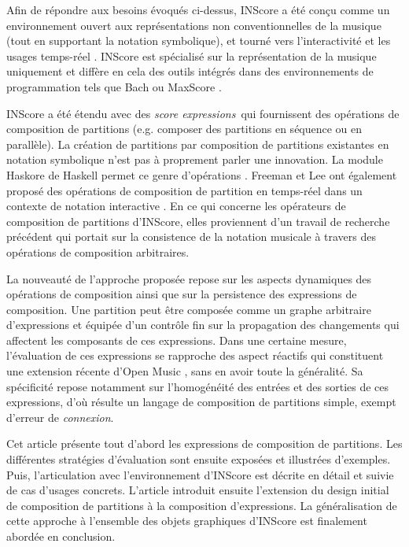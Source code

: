 \documentclass{article}
\newcommand{\sExprs}{\emph{score expressions}}
\begin{document}
Afin de répondre aux besoins évoqués ci-dessus, INScore \cite{Fober:12a,fober14c} a été conçu comme un environnement ouvert aux représentations non conventionnelles de la musique (tout en supportant la notation symbolique), et tourné vers l'interactivité et les usages temps-réel \cite{Fober:13b, Fober:14b}. INScore est spécialisé sur la représentation de la musique uniquement et diffère en cela des outils intégrés dans des environnements de programmation tels que Bach \cite{agostini12b} ou MaxScore \cite{didko08}. 

INScore a été étendu avec des \sExprs\ qui fournissent des opérations de composition de partitions (e.g. composer des partitions en séquence ou en parallèle). La création de partitions par composition de partitions existantes en notation symbolique n'est pas à proprement parler une innovation. La module Haskore de Haskell permet ce genre d'opérations  \cite{haskore}. Freeman et Lee ont également proposé des opérations de composition de partition en temps-réel dans un contexte de notation interactive \cite{Lee:2013}. En ce qui concerne les opérateurs de composition de partitions d'INScore, elles proviennent d'un travail de recherche précédent \cite{fober12b} qui portait sur la consistence de la notation musicale à travers des opérations de composition arbitraires.

La nouveauté de l'approche proposée repose sur les aspects dynamiques des opérations de composition ainsi que sur la persistence des expressions de composition. Une partition peut être composée comme un graphe arbitraire d'expressions et équipée d'un contrôle fin sur la propagation des changements qui affectent les composants de ces expressions. Dans une certaine mesure, l'évaluation de ces expressions se rapproche des aspect réactifs qui constituent une extension récente d'Open Music \cite{bresson:hal-00965747}, sans en avoir toute la généralité. Sa spécificité repose notamment sur l'homogénéité des entrées et des sorties de ces expressions, d'où résulte un langage de composition de partitions simple, exempt d'erreur de \emph{connexion}. 

Cet article présente tout d'abord les expressions de composition de partitions. Les différentes stratégies d'évaluation sont ensuite exposées et illustrées d'exemples. Puis, l'articulation avec l'environnement d'INScore est décrite en détail et suivie de cas d'usages concrets. L'article introduit ensuite l'extension du design initial de composition de partitions à la composition d'expressions. La généralisation de cette approche à l'ensemble des objets graphiques d'INScore est finalement abordée en conclusion.
\end{document}
